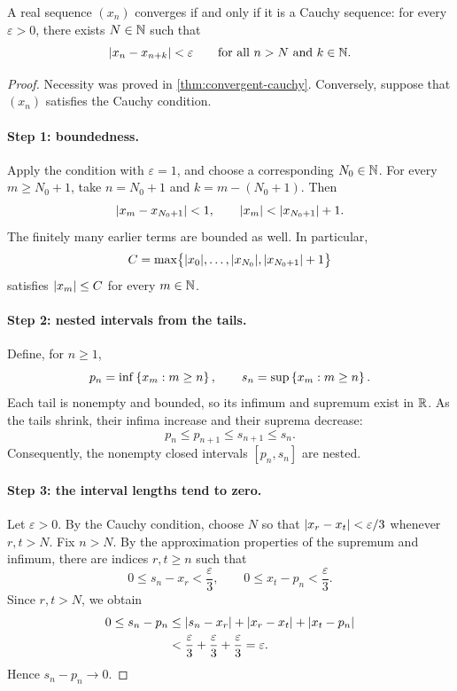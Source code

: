 \documentclass[11pt,a4paper]{amsart}
\begin{document}
\begin{theorem}
  A real sequence \((x_n)\) converges if and only if it is a Cauchy
  sequence: for every \(\varepsilon>0\), there exists \(N\in\mathbb{N}\)
  such that
  \[
    \lvert x_n-x_{n+k}\rvert<\varepsilon
    \qquad\text{for all }n>N\text{ and }k\in\mathbb{N}.
  \]
\end{theorem}

\begin{proof}
  Necessity was proved in \cref{thm:convergent-cauchy}. Conversely,
  suppose that \((x_n)\) satisfies the Cauchy condition.

  \paragraph{Step 1: boundedness.}
  Apply the condition with \(\varepsilon=1\), and choose a corresponding
  \(N_0\in\mathbb{N}\). For every \(m\geq N_0+1\), take
  \(n=N_0+1\) and \(k=m-(N_0+1)\). Then
  \[
    \lvert x_m-x_{N_0+1}\rvert<1,
    \qquad \lvert x_m\rvert<\lvert x_{N_0+1}\rvert+1.
  \]
  The finitely many earlier terms are bounded as well. In particular,
  \[
    C=\max\bigl\{\lvert x_0\rvert,\ldots,\lvert x_{N_0}\rvert,
    \lvert x_{N_0+1}\rvert+1\bigr\}
  \]
  satisfies \(\lvert x_m\rvert\leq C\) for every \(m\in\mathbb{N}\).

  \paragraph{Step 2: nested intervals from the tails.}
  Define, for \(n\geq1\),
  \[
    p_n=\inf\left\lbrace x_m:m\geq n\right\rbrace,
    \qquad s_n=\sup\left\lbrace x_m:m\geq n\right\rbrace.
  \]
  Each tail is nonempty and bounded, so its infimum and supremum
  exist in \(\mathbb{R}\). As the tails shrink, their infima increase and
  their suprema decrease:
  \[
    p_n\leq p_{n+1}\leq s_{n+1}\leq s_n.
  \]
  Consequently, the nonempty closed intervals \([p_n,s_n]\) are nested.

  \paragraph{Step 3: the interval lengths tend to zero.}
  Let \(\varepsilon>0\). By the Cauchy condition, choose \(N\)
  so that \(\lvert x_r-x_t\rvert<\varepsilon/3\) whenever \(r,t>N\).
  Fix \(n>N\). By the approximation properties of the supremum
  and infimum, there are indices \(r,t\geq n\) such that
  \[
    0\leq s_n-x_r<\frac{\varepsilon}{3},
    \qquad 0\leq x_t-p_n<\frac{\varepsilon}{3}.
  \]
  Since \(r,t>N\), we obtain
  \begin{align*}
    0\leq s_n-p_n
    &\leq\lvert s_n-x_r\rvert+\lvert x_r-x_t\rvert+\lvert x_t-p_n\rvert\\
    &<\frac{\varepsilon}{3}+\frac{\varepsilon}{3}
    +\frac{\varepsilon}{3}=\varepsilon.
  \end{align*}
  Hence \(s_n-p_n\to0\).


\end{proof}
\end{document}
